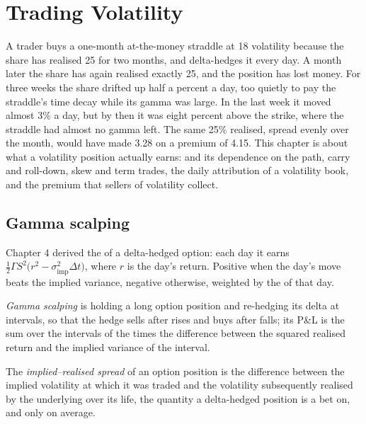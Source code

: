 \chapter{Trading Volatility}\label{ch:dv:trading-volatility}

A trader buys a one-month at-the-money straddle at 18 volatility because the share has realised 25 for two months, and delta-hedges it every
day. A month later the share has again realised exactly 25, and the position has lost money. For three weeks the share drifted up half a
percent a day, too quietly to pay the straddle's time decay while its gamma was large. In the last week it moved almost 3\% a day, but by then it
was eight percent above the strike, where the straddle had almost no gamma left. The same 25\% realised, spread evenly over the month, would have
made 3.28 on a premium of 4.15. This chapter is about what a volatility position actually earns:  and its dependence on the path,
carry and roll-down, skew and term trades, the daily attribution of a volatility book, and the premium that sellers of volatility collect.

\section{Gamma scalping}

Chapter 4 derived the  of a delta-hedged option: each day it earns $\frac12\Gamma S^2\bigl(r^2-\sigma_{\text{imp}}^2\Delta t\bigr)$,
where $r$ is the day's return. Positive when the day's move beats the implied variance, negative otherwise, weighted by the  of that
day.

\begin{definition}\label{def:dv:trading-volatility:scalping}
\emph{Gamma scalping} is holding a long option position and re-hedging its delta at intervals, so that the hedge sells
after rises and buys after falls; its P\&L is the sum over the intervals of the  times the difference between the squared realised
return and the implied variance of the interval.
\end{definition}

\begin{definition}\label{def:dv:trading-volatility:spread}
The \emph{implied--realised spread} of an option position is the difference between the implied volatility at
which it was traded and the volatility subsequently realised by the underlying over its life, the quantity a delta-hedged position is a bet
on, and only on average.
\end{definition}

